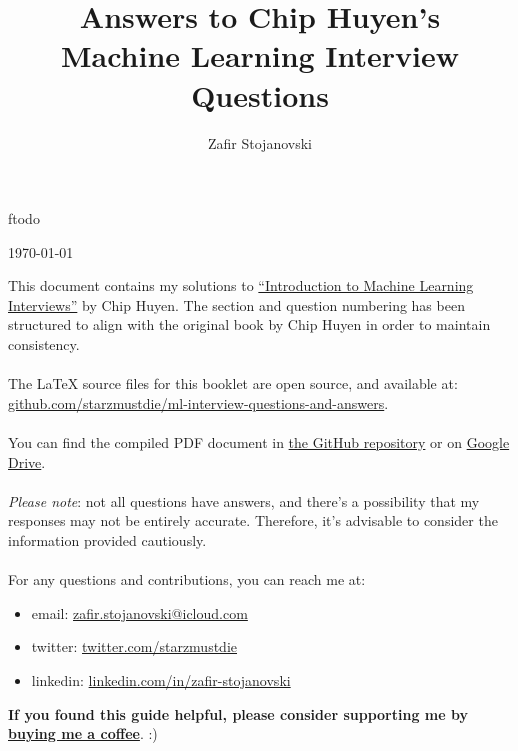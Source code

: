 ƒtodo\documentclass{article}
\title{\Huge Answers to Chip Huyen's \\ Machine Learning Interview Questions}
\author{\Large Zafir Stojanovski}
\date{}
\begin{document}
\maketitle

\thispagestyle{empty} %

\vfill %
\begin{center}
\today
\end{center}

\newpage
\tableofcontents

\setcounter{section}{4}
\newpage

\noindent This document contains my solutions to \href{https://huyenchip.com/ml-interviews-book/}{``Introduction to Machine Learning Interviews''} by Chip Huyen. The section and question numbering has been structured to align with the original book by Chip Huyen in order to maintain consistency.
\\
\\
The \LaTeX \hspace{0.07em} source files for this booklet are open source, and available at: \\ \href{https://github.com/starzmustdie/ml-interview-questions-and-answers}{github.com/starzmustdie/ml-interview-questions-and-answers}. 
\\
\\
You can find the compiled PDF document in \href{https://github.com/starzmustdie/ml-interview-questions-and-answers/blob/main/ML_interview_questions_and_answers.pdf}{the GitHub repository} or on \href{https://drive.google.com/file/d/1P4w12EvvFG19f4uVsvai6fC93p7kRphE/view}{Google Drive}.
\\
\\
\textit{Please note}: not all questions have answers, and there's a possibility that my responses may not be entirely accurate. Therefore, it's advisable to consider the information provided cautiously.
\\
\\
For any questions and contributions, you can reach me at:
\begin{itemize}
    \item email: \href{mailto:zafir.stojanovski@icloud.com}{zafir.stojanovski@icloud.com}
    \item twitter: \href{https://twitter.com/starzmustdie}{twitter.com/starzmustdie}
    \item linkedin: \href{https://www.linkedin.com/in/zafir-stojanovski/}{linkedin.com/in/zafir-stojanovski}
\end{itemize}
\vspace{2em}
\noindent \textbf{If you found this guide helpful, please consider supporting me by \href{https://www.buymeacoffee.com/starzmustdie}{buying me a coffee}}. :) 
\end{document}
